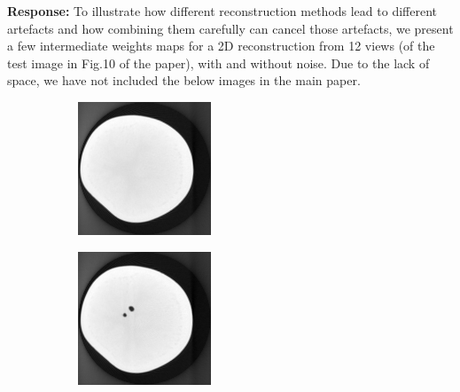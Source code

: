\documentclass{article}
\begin{document}
\textbf{Response:} To illustrate how different reconstruction methods lead to different artefacts and how combining them carefully can cancel those artefacts, we present a few intermediate weights maps for a 2D reconstruction from 12 views (of the test image in Fig.10 of the paper), with and without noise. Due to the lack of space, we have not included the below images in the main paper.
\begin{figure}[!h]
    \begin{subfigure}[b]{0.24\linewidth}
        \includegraphics[width=\textwidth]{../images/potato/template_1.png}
\captionsetup{labelformat=empty}       
 \caption{}
    \end{subfigure}
    \begin{subfigure}[b]{0.24\linewidth}
        \includegraphics[width=\textwidth]{../images/potato/template_2.png}

\end{subfigure}
\end{figure}
\end{document}
